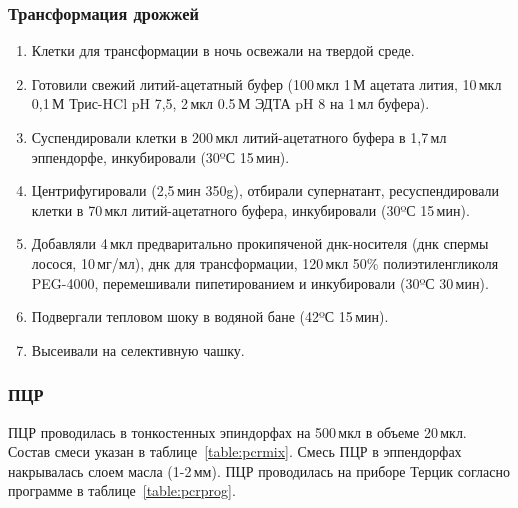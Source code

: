 \subsubsection{Трансформация дрожжей}
\label{subsec:yeast_trans}
\begin{enumerate}[nolistsep]
	\item Клетки для трансформации в ночь освежали на твердой среде.
	\item Готовили свежий литий-ацетатный буфер (100\,мкл 1\,М ацетата лития, 10\,мкл 0,1\,М Трис-HCl pH 7,5, 2\,мкл 0.5\,М ЭДТА pH 8 на 1\,мл буфера).
	\item Суспендировали клетки в 200\,мкл литий-ацетатного буфера в 1,7\,мл эппендорфе, инкубировали (30ºС 15\,мин).
	\item Центрифугировали (2,5\,мин 350g), отбирали супернатант, ресуспендировали клетки в 70\,мкл литий-ацетатного буфера, инкубировали (30ºС 15\,мин).
	\item Добавляли 4\,мкл предваритально прокипяченой днк-носителя (днк спермы лосося, 10\,мг/мл), днк для трансформации, 120\,мкл 50\% полиэтиленгликоля PEG-4000, перемешивали пипетированием и инкубировали (30ºС 30\,мин).
	\item Подвергали тепловом шоку в водяной бане (42ºС 15\,мин).
	\item Высеивали на селективную чашку. 
\end{enumerate}



\subsubsection{ПЦР}
\label{subsec:pcr}


ПЦР проводилась в тонкостенных эпиндорфах на 500\,мкл в объеме 20\,мкл. Состав смеси указан в таблице~\ref{table:pcrmix}. Смесь ПЦР в эппендорфах накрывалась слоем масла (1-2\,мм). ПЦР проводилась на приборе Терцик согласно программе в таблице~\ref{table:pcrprog}.

